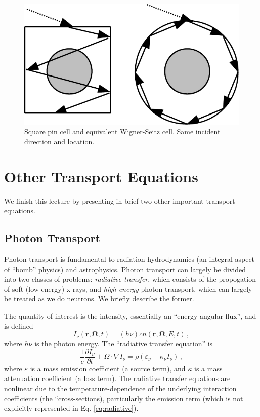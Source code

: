\begin{figure}[h] 
    \centering
    \includegraphics[keepaspectratio, width = 3.0 in]{images/wignerseitz}
    \caption{Square pin cell and equivalent Wigner-Seitz cell.  Same incident direction and location.}
    \label{fig:wignerseitz}
\end{figure}

\section*{Other Transport Equations}

We finish this lecture by presenting in brief two other important transport equations.

\subsection*{Photon Transport}

Photon transport is fundamental to radiation hydrodynamics (an integral aspect of ``bomb'' physics) and astrophysics.  Photon transport can largely be divided into two classes of problems: \textit{radiative transfer}, which consists of the propogation of soft (low energy) x-rays, and \textit{high energy} photon transport, which can largely be treated as we do neutrons.  We briefly describe the former.

The quantity of interest is the intensity, essentially an ``energy angular flux'', and is defined
\begin{equation}
 I_{\nu}(\mathbf{r},\mathbf{\Omega},t) = (h\nu)cn(\mathbf{r},\mathbf{\Omega},E,t) \, ,
\end{equation}
where $h\nu$ is the photon energy.  The ``radiative transfer equation'' is
\begin{equation}
 \frac{1}{c}\frac{\partial I_{\nu}}{\partial t} + \Omega \cdot \nabla I_{\nu} = \rho(\varepsilon_{\nu} - \kappa_{\nu}I_{\nu}) \, ,
 \label{eq:radiative}
\end{equation}
where $\varepsilon$ is a mass emission coefficient (a source term), and $\kappa$ is a mass attenuation coefficient (a loss term).  The radiative transfer equations are nonlinear due to the temperature-dependence of the underlying interaction coefficients (the ``cross-sections), particularly the emission term (which is not explicitly represented in Eq. \ref{eq:radiative}).

